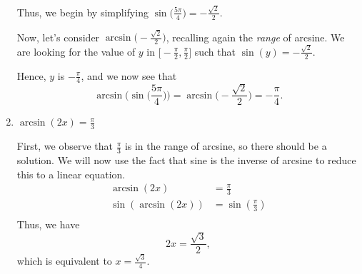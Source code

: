 \documentclass{ximera}
\begin{document}
\begin{example}
\begin{enumerate}
\begin{explanation}
Thus, we begin by simplifying $\sin\!\Big(\frac{5\pi}{4}\Big) = -\frac{\sqrt{2}}{2}$. 

Now, let's consider $\arcsin\!\Big(\!\!-\!\frac{\sqrt{2}}{2}\Big)$, recalling again the {\it range} of arcsine. We are looking for the value of $y$ in $\Big[\!-\frac{\pi}{2},\frac{\pi}{2}\Big]$ such that $\sin(y) =-\frac{\sqrt{2}}{2}$.

Hence, $y$ is $-\frac{\pi}{4}$, and we now see that 
\begin{equation*}
\arcsin\!\Big(\sin\!\Big(\frac{5\pi}{4}\Big)\Big) = \arcsin\!\Big(\!\!-\!\frac{\sqrt{2}}{2}\Big) = -\frac{\pi}{4}.
\end{equation*}


\end{explanation}


\item $\arcsin(2x) = \frac{\pi}{3}$\\
\begin{explanation}
First, we observe that $\frac{\pi}{3}$ is in the range of arcsine, so there should be a solution. We will now use the fact that sine is the inverse of arcsine to reduce this to a linear equation.
\begin{align*}
\arcsin(2x) &= \frac{\pi}{3}\\
\sin(\arcsin(2x)) &= \sin\left(\frac{\pi}{3}\right) \\
\end{align*}
Thus, we have
$$2x = \frac{\sqrt{3}}{2},$$
which is equivalent to $x = \frac{\sqrt{3}}{4}$.

\end{explanation}
\end{enumerate}
\end{example}
\end{document}
